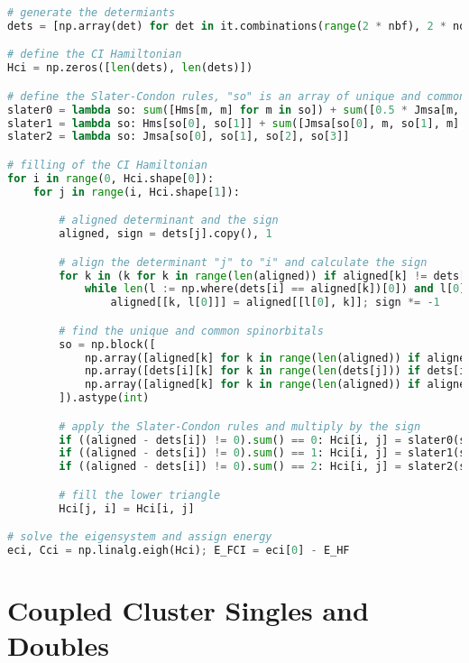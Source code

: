 \raggedbottom\begin{lstlisting}[language=Python, caption={\acrshort{ci} exercise code solution.}, label=code:ci_solution]
# generate the determiants
dets = [np.array(det) for det in it.combinations(range(2 * nbf), 2 * nocc)]

# define the CI Hamiltonian
Hci = np.zeros([len(dets), len(dets)])

# define the Slater-Condon rules, "so" is an array of unique and common spinorbitals [unique, common]
slater0 = lambda so: sum([Hms[m, m] for m in so]) + sum([0.5 * Jmsa[m, n, m, n] for m, n in it.product(so, so)])
slater1 = lambda so: Hms[so[0], so[1]] + sum([Jmsa[so[0], m, so[1], m] for m in so[2:]])
slater2 = lambda so: Jmsa[so[0], so[1], so[2], so[3]]

# filling of the CI Hamiltonian
for i in range(0, Hci.shape[0]):
    for j in range(i, Hci.shape[1]):

        # aligned determinant and the sign
        aligned, sign = dets[j].copy(), 1

        # align the determinant "j" to "i" and calculate the sign
        for k in (k for k in range(len(aligned)) if aligned[k] != dets[i][k]):
            while len(l := np.where(dets[i] == aligned[k])[0]) and l[0] != k:
                aligned[[k, l[0]]] = aligned[[l[0], k]]; sign *= -1

        # find the unique and common spinorbitals
        so = np.block([
            np.array([aligned[k] for k in range(len(aligned)) if aligned[k] not in dets[i]]),
            np.array([dets[i][k] for k in range(len(dets[j])) if dets[i][k] not in aligned]),
            np.array([aligned[k] for k in range(len(aligned)) if aligned[k] in dets[i]])
        ]).astype(int)

        # apply the Slater-Condon rules and multiply by the sign
        if ((aligned - dets[i]) != 0).sum() == 0: Hci[i, j] = slater0(so) * sign
        if ((aligned - dets[i]) != 0).sum() == 1: Hci[i, j] = slater1(so) * sign
        if ((aligned - dets[i]) != 0).sum() == 2: Hci[i, j] = slater2(so) * sign

        # fill the lower triangle
        Hci[j, i] = Hci[i, j]

# solve the eigensystem and assign energy
eci, Cci = np.linalg.eigh(Hci); E_FCI = eci[0] - E_HF
\end{lstlisting}

\section{\texorpdfstring{Coupled Cluster Singles and Doubles\label{sec:cc_code_solution}}{Coupled Cluster Singles and Doubles}}

